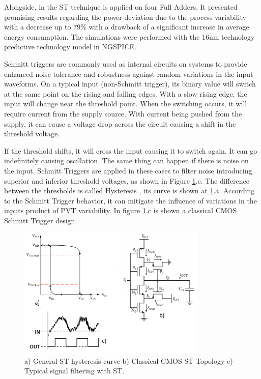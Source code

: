 \documentclass[ecp,tc, english]{iiufrgs}
\begin{document}
Alongside, in \cite{samuel2016} the ST technique is applied on four Full Adders. It presented promising results regarding the power deviation due to the process variability with a decrease up to 79\% with a drawback of a significant increase in average energy consumption. The simulations were performed with the 16nm technology predictive technology model in NGSPICE. 

Schmitt triggers are commonly used as internal circuits on systems to provide enhanced noise tolerance and robustness against random variations in the input waveforms. On a typical input (non-Schmitt trigger), its binary value will switch at the same point on the rising and falling edges. With a slow rising edge, the input will change near the threshold point. When the switching occurs, it will require current from the supply source. With current being pushed from the supply, it can cause a voltage drop across the circuit causing a shift in the threshold voltage. 

If the threshold shifts, it will cross the input causing it to switch again. It can go indefinitely causing oscillation. The same thing can happen if there is noise on the input. Schmitt Triggers are applied in these cases to filter noise introducing superior and inferior threshold voltages, as shown in Figure \ref{fig:Fig3}.c. The difference between the thresholds is called Hysteresis \cite{WinNT}, its curve is shown at \ref{fig:Fig3}.a. According to the Schmitt Trigger behavior, it can mitigate the influence of variations in the inputs product of PVT variability. In figure \ref{fig:Fig3}.c is shown a classical CMOS Schmitt Trigger design. 

\begin{figure}[H]
\centering
\includegraphics[width=0.8\textwidth]{Hysteresis.png}
\caption{a) General ST hysteresis curve b) Classical CMOS ST Topology c) Typical signal filtering with ST.}
\label{fig:Fig3}
\end{figure}
\end{document}
